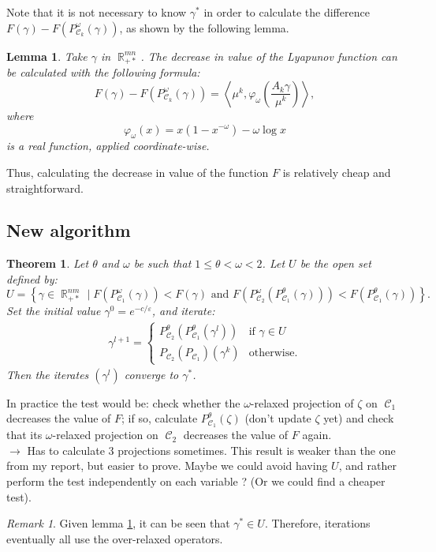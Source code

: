 \documentclass{article} %
\newcommand{\scal}[2]{\left\langle #1 , #2 \right\rangle}
\DeclareMathOperator{\IR}{\mathbb{R}}
\DeclareMathOperator{\Ccal}{\mathcal{C}}
\renewcommand{\epsilon}{\varepsilon}
\theoremstyle{plain}
\newtheorem{theorem}{Theorem}
\newtheorem{lemma}{Lemma}
\theoremstyle{definition}
\theoremstyle{remark}
\newtheorem{remark}{Remark}
\begin{document}
Note that it is not necessary to know $\gamma^*$ in order to calculate the difference $F(\gamma) - F(P^\omega_{\Ccal_k}(\gamma))$, as shown by the following lemma.
\begin{lemma}\label{lemma:lyapunov_decrease}
	Take $\gamma$ in $\IR^{mn}_{+*}$. The decrease in value of the Lyapunov function can be calculated with the following formula:
	\begin{equation} \label{eq:kl_diff_scal}
	F(\gamma) - F(P^\omega_{\Ccal_k}(\gamma)) = 
	\scal{\mu^k}{\varphi_\omega \left(\frac{A_k \gamma}{\mu^k}\right)},
	\end{equation}
	where
	\begin{equation}
	\varphi_\omega(x) = x(1-x^{-\omega}) - \omega \log x
	\end{equation}
	is a real function, applied coordinate-wise.
\end{lemma}
Thus, calculating the decrease in value of the function $F$ is relatively cheap and straightforward.

\subsection{New algorithm}

\begin{theorem}
	Let $\theta$ and $\omega$ be such that $1\le \theta < \omega < 2$. Let $U$ be the open set defined by:
	\begin{equation}\label{eq:open_set_U}
	U = \left\{
	\gamma \in \IR_{+*}^{nm} \mid
	F(P^\omega_{\Ccal_1}(\gamma)) < F(\gamma)
	\text{ and }
	F(P^\omega_{\Ccal_2}(P^\theta_{\Ccal_1}(\gamma))) < F(P^\theta_{\Ccal_1}(\gamma))
	\right\}.
	\end{equation}
	Set the initial value $\gamma^0 = e^{-c/\epsilon}$, and iterate:
	\begin{align*}
	\gamma^{l+1} =
	\begin{cases}
	P^\theta_{\Ccal_2}(P^\theta_{\Ccal_1}(\gamma^l)) & \text{if } \gamma \in U \\
	P_{\Ccal_2}(P_{\Ccal_1})(\gamma^k) & \text{otherwise.}
	\end{cases}
	\end{align*}
	Then the iterates $(\gamma^l)$ converge to $\gamma^*$.
\end{theorem}
{\color{red} 
	In practice the test would be: check whether the $\omega$-relaxed projection of $\zeta$ on $\Ccal_1$ decreases the value of
	$F$; if so, calculate $P_{\Ccal_1}^\theta(\zeta)$ (don't update $\zeta$ yet) and check that its $\omega$-relaxed projection on $\Ccal_2$ decreases the value of $F$ again. \\
	$\longrightarrow$ Has to calculate 3 projections sometimes. This result is weaker than the one from my report, but easier to prove. Maybe we could avoid having $U$, and rather perform the test independently on each variable ? (Or we could find a cheaper test).}
\begin{remark}
	Given lemma \ref{lemma:lyapunov_decrease}, it can be seen that $\gamma^* \in U$. Therefore, iterations eventually all use the over-relaxed operators.
\end{remark}
\end{document}
